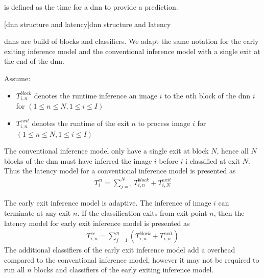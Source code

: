 	\begin{enumdescript}
		\item[Inference Latency] is defined as the time for a \gls{dnn} to provide a prediction. 
		
		\begin{minipage}[t]{\linewidth}
			[\gls{dnn} structure and latency]{\gls{dnn} structure and latency}
		\end{minipage}
		
		\gls{dnn}s are build of blocks and classifiers. We adapt the same notation for the early exiting inference model and the conventional inference model with a single exit at the end of the \gls{dnn}. 
		
		Assume:
		\begin{itemize}
			\item $T_{i,n}^{block}$ denotes the runtime inference an image $ i $ to the $ n $th block of the \gls{dnn} $ i $ for $ \left(1\leq n \leq N, 1 \leq i \leq I\right) $
			\item $T_{i,n}^{exit}$ denotes the runtime of the exit $ n $  to process image $i$ for $ \left(1\leq n \leq N, 1 \leq i \leq I\right) $
		\end{itemize}
		\begin{enumdescript}
			\item[Conventional Inference Latency] The conventional inference model only have a single exit at block $ N $, hence all $ N $ blocks of the \gls{dnn} must have inferred the image $ i $ before $ i $ i classified at exit $ N $. Thus the latency model for a conventional inference model is presented as
			\begin{align}
			T^{ci}_{i}= \sum_{j=1}^{N} T_{i,n}^{block} + T_{i,N}^{exit}
			\end{align}
			\item[Early Exit Inference Latency] The early exit inference model is adaptive. The inference of image $ i $ can terminate at any exit $ n $. If the classification exits from exit point $ n $, then the latency model for early exit inference model is presented as
			\begin{align}
			T_{i,n}^{ee}=\sum_{j=1}^{n} \left(T_{i,n}^{block} + T_{i,n}^{exit} \right) 
			\end{align}
			The additional classifiers of the early exit inference model add a overhead compared to the conventional inference model, however it may not be required to run all $ n $ blocks and classifiers of the early exiting inference model. 
		\end{enumdescript}
		

\end{enumdescript}
